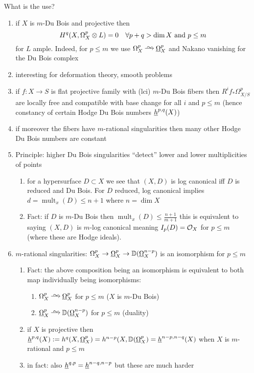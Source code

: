 \documentclass[12pt]{article}
\DeclareMathOperator{\mult}{\mathrm{mult}}
\begin{document}
What is the use?
\begin{enumerate}
\item if $X$ is $m$-Du Bois and projective then 
\[ H^q(X, \Omega_X^p \otimes L) = 0 \quad \forall p + q > \dim{X} \text{ and } p \le m \]
for $L$ ample. Indeed, for $p \le m$ we use $\Omega_X^p \iso \ulO^p_X$ and Nakano vanishing for the Du Bois complex

\item interesting for deformation theory, smooth problems

\item if $f : X \to S$ is flat projective family with (lci) $m$-Du Bois fibers then $R^i f_* \Omega_{X/S}^p$ are locally free and compatible with base change for all $i$ and $p \le m$ (hence constancy of certain Hodge Du Bois numbers $\underline{h}^{p,q}(X)$)

\item if moreover the fibers have $m$-rational singularities then many other Hodge Du Bois numbers are constant

\item Principle: higher Du Bois singularities ``detect'' lower and lower multiplicities of points
\begin{enumerate}
\item for a hypersurface $D \subset X$ we see that $(X,D)$ is log canonical iff $D$ is reduced and Du Bois. For $D$ reduced, log canonical implies $d = \mult_x(D) \le n + 1$ where $n = \dim{X}$
\item Fact: if $D$ is $m$-Du Bois then $\mult_x(D) \le \frac{n+1}{m+1}$ this is equivalent to saying $(X, D)$ is $m$-log canonical meaning $I_p(D) = \mathcal{O}_{X}$ for $p \le m$ (where these are Hodge ideals).
\end{enumerate} 
\item $m$-rational singularities: $\Omega_X^p \to \underline{\Omega}^p_X \to \mathbb{D}(\underline{\Omega}_X^{n-p})$ is an isomorphism for $p \le m$
\begin{enumerate}
\item Fact: the above composition being an isomorphism is equivalent to both map individually being isomorphisms:
\begin{enumerate}
\item $\Omega_X^p \iso \ulO_X^p$ for $p \le m$ ($X$ is $m$-Du Bois)
\item $\ulO_X^p \iso \DD(\ulO_X^{n-p})$ for $p \le m$ (duality)
\end{enumerate}
\item if $X$ is projective then $\underline{h}^{p,q}(X) := h^{q}(X, \underline{\Omega}_X^p) = h^{n-p}(X, \mathbb{D}(\underline{\Omega}_X^p) = \underline{h}^{n-p,n-q}(X)$ when $X$ is $m$-rational and $p \le m$
\item in fact: also $\underline{h}^{q,p} = \underline{h}^{n-q, n-p}$ but these are much harder 
\end{enumerate}
\end{enumerate}
\end{document}
